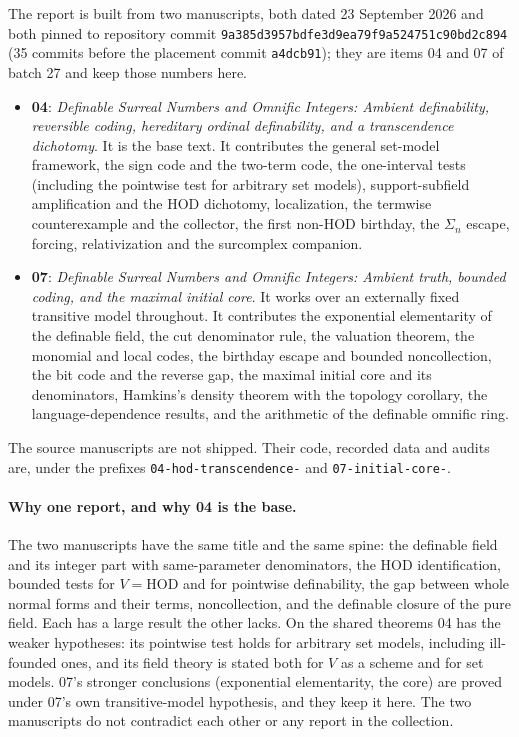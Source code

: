 \documentclass[11pt,a4paper]{article}
\numberwithin{equation}{section}
\theoremstyle{definition}
\theoremstyle{remark}
\newcommand{\HOD}{\mathrm{HOD}}
\newcommand{\repoSHA}{\texttt{9a385d3957bdfe3d9ea79f9a524751c90bd2c894}}
\newcommand{\fn}[1]{\nolinkurl{#1}}
\begin{document}
The report is built from two manuscripts, both dated 23 September 2026 and
both pinned to repository commit \repoSHA{} (35 commits before the
placement commit \texttt{a4dcb91}); they are items 04 and 07 of batch 27
and keep those numbers here.
\begin{itemize}
\item \textbf{04}: \emph{Definable Surreal Numbers and Omnific Integers:
Ambient definability, reversible coding, hereditary ordinal definability,
and a transcendence dichotomy}. It is the base text. It contributes the
general set-model framework, the sign code and the two-term code, the
one-interval tests (including the pointwise test for arbitrary set
models), support-subfield amplification and the $\HOD$ dichotomy,
localization, the termwise counterexample and the collector, the first
non-$\HOD$ birthday, the $\Sigma_n$ escape, forcing, relativization and
the surcomplex companion.
\item \textbf{07}: \emph{Definable Surreal Numbers and Omnific Integers:
Ambient truth, bounded coding, and the maximal initial core}. It works over
an externally fixed transitive model throughout. It contributes the
exponential elementarity of the definable field, the cut denominator rule,
the valuation theorem, the monomial and local codes, the birthday escape
and bounded noncollection, the bit code and the reverse gap, the maximal
initial core and its denominators, Hamkins's density theorem with the
topology corollary, the language-dependence results, and the arithmetic of
the definable omnific ring.
\end{itemize}
The source manuscripts are not shipped. Their code, recorded data and
audits are, under the prefixes \fn{04-hod-transcendence-} and
\fn{07-initial-core-}.

\paragraph{Why one report, and why 04 is the base.}
The two manuscripts have the same title and the same spine: the definable
field and its integer part with same-parameter denominators, the $\HOD$
identification, bounded tests for $V=\HOD$ and for pointwise
definability, the gap between whole normal forms and their terms,
noncollection, and the definable closure of the pure field. Each has a
large result the other lacks. On the shared theorems 04 has the weaker
hypotheses: its pointwise test holds for arbitrary set models, including
ill-founded ones, and its field theory is stated both for $V$ as a scheme
and for set models. 07's stronger conclusions (exponential elementarity,
the core) are proved under 07's own transitive-model hypothesis, and they
keep it here. The two manuscripts do not contradict each other or any
report in the collection.
\end{document}
